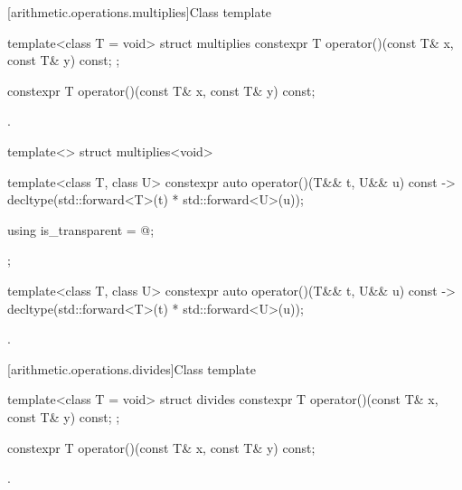 [arithmetic.operations.multiplies]{Class template }

%
\begin{itemdecl}
template<class T = void> struct multiplies {
  constexpr T operator()(const T& x, const T& y) const;
};
\end{itemdecl}

%
\begin{itemdecl}
constexpr T operator()(const T& x, const T& y) const;
\end{itemdecl}

\begin{itemdescr}
\pnum
\returns
{}.
\end{itemdescr}

%
\begin{itemdecl}
template<> struct multiplies<void> {
  template<class T, class U> constexpr auto operator()(T&& t, U&& u) const
    -> decltype(std::forward<T>(t) * std::forward<U>(u));

  using is_transparent = @\unspec@;
};
\end{itemdecl}

%
\begin{itemdecl}
template<class T, class U> constexpr auto operator()(T&& t, U&& u) const
    -> decltype(std::forward<T>(t) * std::forward<U>(u));
\end{itemdecl}

\begin{itemdescr}
\pnum
\returns
{}.
\end{itemdescr}

[arithmetic.operations.divides]{Class template }

%
\begin{itemdecl}
template<class T = void> struct divides {
  constexpr T operator()(const T& x, const T& y) const;
};
\end{itemdecl}

%
\begin{itemdecl}
constexpr T operator()(const T& x, const T& y) const;
\end{itemdecl}

\begin{itemdescr}
\pnum
\returns
{}.
\end{itemdescr}


